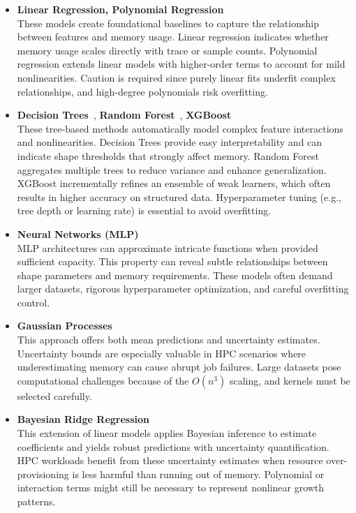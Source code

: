\begin{itemize}
    \item \textbf{Linear Regression, Polynomial Regression}~\cite{hastie2009elements}\\
    These models create foundational baselines to capture the relationship between features and memory usage.
    Linear regression indicates whether memory usage scales directly with trace or sample counts.
    Polynomial regression extends linear models with higher-order terms to account for mild nonlinearities.
    Caution is required since purely linear fits underfit complex relationships, and high-degree polynomials risk overfitting.

    \item \textbf{Decision Trees}~\cite{breiman1984classification}, \textbf{Random Forest}~\cite{breiman2001random}, \textbf{\ac{XGBoost}}~\cite{chen2016xgboost}\\
    These tree-based methods automatically model complex feature interactions and nonlinearities.
    Decision Trees provide easy interpretability and can indicate shape thresholds that strongly affect memory.
    Random Forest aggregates multiple trees to reduce variance and enhance generalization.
    \ac{XGBoost} incrementally refines an ensemble of weak learners, which often results in higher accuracy on structured data.
    Hyperparameter tuning (e.g., tree depth or learning rate) is essential to avoid overfitting.

    \item \textbf{Neural Networks (\ac{MLP})}~\cite{rumelhart1986learning}\\
    \ac{MLP} architectures can approximate intricate functions when provided sufficient capacity.
    This property can reveal subtle relationships between shape parameters and memory requirements.
    These models often demand larger datasets, rigorous hyperparameter optimization, and careful overfitting control.

    \item \textbf{Gaussian Processes}~\cite{rasmussen2006gaussian}\\
    This approach offers both mean predictions and uncertainty estimates.
    Uncertainty bounds are especially valuable in \ac{HPC} scenarios where underestimating memory can cause abrupt job failures.
    Large datasets pose computational challenges because of the \(O(n^3)\) scaling, and kernels must be selected carefully.

    \item \textbf{Bayesian Ridge Regression}~\cite{bishop2006pattern}\\
    This extension of linear models applies Bayesian inference to estimate coefficients and yields robust predictions with uncertainty quantification.
    HPC workloads benefit from these uncertainty estimates when resource over-provisioning is less harmful than running out of memory.
    Polynomial or interaction terms might still be necessary to represent nonlinear growth patterns.
\end{itemize}

